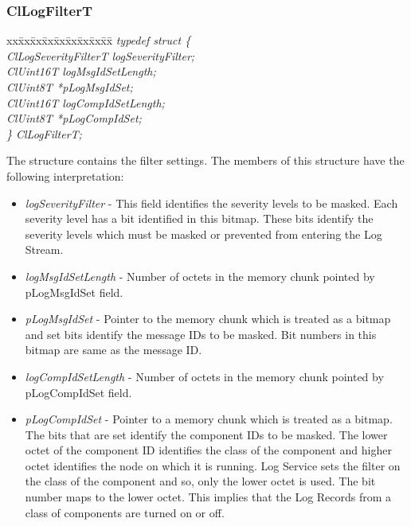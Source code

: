 \begin{flushleft}
\subsubsection{ClLogFilterT}
\begin{tabbing}
xx\=xx\=xx\=xx\=xx\=xx\=xx\=xx\=xx\=\kill
\textit{typedef struct \{}\\
\>\>\>\>\textit{ClLogSeverityFilterT	logSeverityFilter;}\\
\>\>\>\>\textit{ClUint16T			logMsgIdSetLength;}\\
\>\>\>\>\textit{ClUint8T			*pLogMsgIdSet;}\\
\>\>\>\>\textit{ClUint16T			logCompIdSetLength;}\\
\>\>\>\>\textit{ClUint8T			*pLogCompIdSet;}\\
\textit{\} ClLogFilterT;}\end{tabbing}
The structure contains the filter settings. The members of this structure have the following interpretation:
\begin{itemize}
\item
\textit{logSeverityFilter} - This field identifies the severity levels to be masked. Each severity level has a bit identified in this
bitmap. These bits identify the severity levels which must be masked or prevented from entering the Log Stream.
\item
\textit{logMsgIdSetLength} - Number of octets in the memory chunk pointed by pLogMsgIdSet field.
\item
\textit{pLogMsgIdSet} - Pointer to the memory chunk which is treated as a bitmap and set bits identify the message IDs to be masked. Bit numbers
in this bitmap are same as the message ID.
\item
\textit{logCompIdSetLength} - Number of octets in the memory chunk pointed by pLogCompIdSet field.
\item
\textit{pLogCompIdSet} - Pointer to a memory chunk which is treated as a bitmap. The bits that are set identify the component IDs to be masked. 
The lower octet of the component ID identifies the class of the component and higher octet identifies the node on which 
it is running. Log Service sets the filter on the class of the component and so, only the lower octet is used. The bit number maps to the lower
octet. This implies that the Log Records from a class of components are turned on or off.
\end{itemize}	








\end{flushleft}
